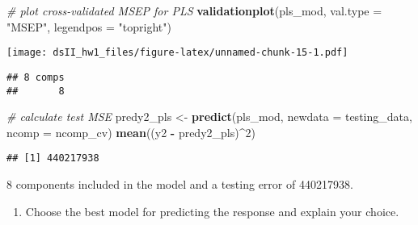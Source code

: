 \documentclass[
]{article}
\newenvironment{Shaded}{\begin{snugshade}}{\end{snugshade}}
\newcommand{\AttributeTok}[1]{\textcolor[rgb]{0.13,0.29,0.53}{#1}}
\newcommand{\CommentTok}[1]{\textcolor[rgb]{0.56,0.35,0.01}{\textit{#1}}}
\newcommand{\DecValTok}[1]{\textcolor[rgb]{0.00,0.00,0.81}{#1}}
\newcommand{\FunctionTok}[1]{\textcolor[rgb]{0.13,0.29,0.53}{\textbf{#1}}}
\newcommand{\NormalTok}[1]{#1}
\newcommand{\OtherTok}[1]{\textcolor[rgb]{0.56,0.35,0.01}{#1}}
\newcommand{\SpecialCharTok}[1]{\textcolor[rgb]{0.81,0.36,0.00}{\textbf{#1}}}
\newcommand{\StringTok}[1]{\textcolor[rgb]{0.31,0.60,0.02}{#1}}
\providecommand{\tightlist}{%
  \setlength{\itemsep}{0pt}\setlength{\parskip}{0pt}}
\begin{document}
\begin{Shaded}
\begin{Highlighting}[]
\CommentTok{\# plot cross{-}validated MSEP for PLS}
\FunctionTok{validationplot}\NormalTok{(pls\_mod, }\AttributeTok{val.type =} \StringTok{"MSEP"}\NormalTok{, }\AttributeTok{legendpos =} \StringTok{"topright"}\NormalTok{)}
\end{Highlighting}
\end{Shaded}

\texttt{[image: dsII\_hw1\_files/figure-latex/unnamed-chunk-15-1.pdf]}

\begin{Shaded}
\end{Shaded}

\begin{verbatim}
## 8 comps 
##       8
\end{verbatim}

\begin{Shaded}
\begin{Highlighting}[]
\CommentTok{\# calculate test MSE}
\NormalTok{predy2\_pls }\OtherTok{\textless{}{-}} \FunctionTok{predict}\NormalTok{(pls\_mod, }\AttributeTok{newdata =}\NormalTok{ testing\_data,}
\AttributeTok{ncomp =}\NormalTok{ ncomp\_cv)}
\FunctionTok{mean}\NormalTok{((y2 }\SpecialCharTok{{-}}\NormalTok{ predy2\_pls)}\SpecialCharTok{\^{}}\DecValTok{2}\NormalTok{)}
\end{Highlighting}
\end{Shaded}

\begin{verbatim}
## [1] 440217938
\end{verbatim}

8 components included in the model and a testing error of 440217938.

\begin{enumerate}
\def\labelenumi{(\alph{enumi})}
\setcounter{enumi}{3}
\tightlist
\item
  Choose the best model for predicting the response and explain your
  choice.
\end{enumerate}
\end{document}
